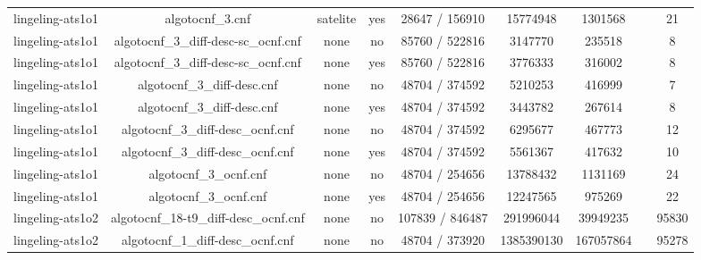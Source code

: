 \begin{appendices}
\begin{table}[p]
\begin{center}
\begin{tabular}{l|cccccccc}
  lingeling-ats1o1               & algotocnf\_3.cnf               & satelite   & yes   & 28647 / 156910 & 15774948  & 1301568   &            & 21 \\ %
  lingeling-ats1o1               & algotocnf\_3\_diff-desc-sc\_ocnf.cnf & none       & no    & 85760 / 522816 & 3147770   & 235518    &            & 8 \\ %
  lingeling-ats1o1               & algotocnf\_3\_diff-desc-sc\_ocnf.cnf & none       & yes   & 85760 / 522816 & 3776333   & 316002    &            & 8 \\ %
  lingeling-ats1o1               & algotocnf\_3\_diff-desc.cnf    & none       & no    & 48704 / 374592 & 5210253   & 416999    &            & 7 \\ %
  lingeling-ats1o1               & algotocnf\_3\_diff-desc.cnf    & none       & yes   & 48704 / 374592 & 3443782   & 267614    &            & 8 \\ %
  lingeling-ats1o1               & algotocnf\_3\_diff-desc\_ocnf.cnf & none       & no    & 48704 / 374592 & 6295677   & 467773    &            & 12 \\ %
  lingeling-ats1o1               & algotocnf\_3\_diff-desc\_ocnf.cnf & none       & yes   & 48704 / 374592 & 5561367   & 417632    &            & 10 \\ %
  lingeling-ats1o1               & algotocnf\_3\_ocnf.cnf         & none       & no    & 48704 / 254656 & 13788432  & 1131169   &            & 24 \\ %
  lingeling-ats1o1               & algotocnf\_3\_ocnf.cnf         & none       & yes   & 48704 / 254656 & 12247565  & 975269    &            & 22 \\ %
  lingeling-ats1o2               & algotocnf\_18-t9\_diff-desc\_ocnf.cnf & none       & no    & 107839 / 846487 & 291996044 & 39949235  &            & 95830 \\ %
  lingeling-ats1o2               & algotocnf\_1\_diff-desc\_ocnf.cnf & none       & no    & 48704 / 373920 & 1385390130 & 167057864 &            & 95278 \\ %

\end{tabular}
\end{center}
\end{table}
\end{appendices}
